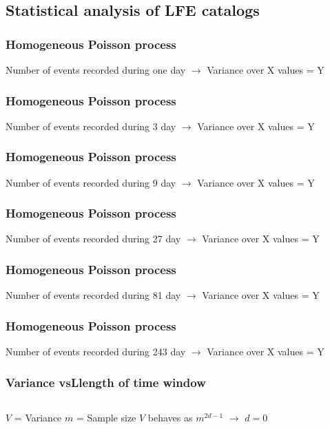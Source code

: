 \documentclass{beamer}
\begin{document}
	\subsection{Statistical analysis of LFE catalogs}

	\begin{frame}
		\frametitle{Homogeneous Poisson process}
		Number of events recorded during one day $\rightarrow$ Variance over X values = Y
	\end{frame}

	\begin{frame}
		\frametitle{Homogeneous Poisson process}
		Number of events recorded during 3 day $\rightarrow$ Variance over X values = Y
	\end{frame}

	\begin{frame}
		\frametitle{Homogeneous Poisson process}
		Number of events recorded during 9 day $\rightarrow$ Variance over X values = Y
	\end{frame}

	\begin{frame}
		\frametitle{Homogeneous Poisson process}
		Number of events recorded during 27 day $\rightarrow$ Variance over X values = Y
	\end{frame}

	\begin{frame}
		\frametitle{Homogeneous Poisson process}
		Number of events recorded during 81 day $\rightarrow$ Variance over X values = Y
	\end{frame}

	\begin{frame}
		\frametitle{Homogeneous Poisson process}
		Number of events recorded during 243 day $\rightarrow$ Variance over X values = Y
	\end{frame}

	\begin{frame}
		\frametitle{Variance vsLlength of time window}
		\begin{columns}[c]
			\begin{column}{5cm}
				$V$ = Variance
				$m$ = Sample size
				$V$ behaves as $m^{2 d - 1}$
				$\rightarrow$ $d =  0$
			\end{column}
			\begin{column}{7cm}
				\begin{center}
				\end{center}
			\end{column}
		\end{columns}
	\end{frame}
\end{document}
